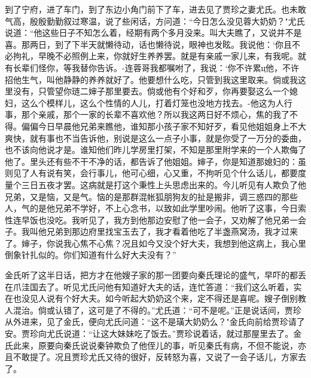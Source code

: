 到了宁府，进了车门，到了东边小角门前下了车，进去见了贾珍之妻尤氏。也未敢气高，殷殷勤勤叙过寒温，说了些闲话，方问道：“今日怎么没见蓉大奶奶？"尤氏说道：“他这些日子不知怎么着，经期有两个多月没来。叫大夫瞧了，又说并不是喜。那两日，到了下半天就懒待动，话也懒待说，眼神也发眩。我说他：`你且不必拘礼，早晚不必照例上来，你就好生养养罢。就是有亲戚一家儿来，有我呢。就有长辈们怪你，等我替你告诉。-连蓉哥我都嘱咐了，我说：`你不许累ц他，不许招他生气，叫他静静的养养就好了。他要想什么吃，只管到我这里取来。倘或我这里没有，只管望你琏二婶子那里要去。倘或他有个好和歹，你再要娶这么一个媳妇，这么个模样儿，这么个性情的人儿，打着灯笼也没地方找去。-他这为人行事，那个亲戚，那个一家的长辈不喜欢他？所以我这两日好不烦心，焦的我了不得。偏偏今日早晨他兄弟来瞧他，谁知那小孩子家不知好歹，看见他姐姐身上不大爽快，就有事也不当告诉他，别说是这么一点子小事，就是你受了一万分的委曲，也不该向他说才是。谁知他们昨儿学房里打架，不知是那里附学来的一个人欺侮了他了。里头还有些不干不净的话，都告诉了他姐姐。婶子，你是知道那媳妇的：虽则见了人有说有笑，会行事儿，他可心细，心又重，不拘听见个什么话儿，都要度量个三日五夜才罢。这病就是打这个秉性上头思虑出来的。今儿听见有人欺负了他兄弟，又是恼，又是气。恼的是那群混帐狐朋狗友的扯是搬非，调三惑四的那些人，气的是他兄弟不学好，不上心念书，以致如此学里吵闹。他听了这事，今日索性连早饭也没吃。我听见了，我方到他那边安慰了他一会子，又劝解了他兄弟一会子。我叫他兄弟到那边府里找宝玉去了，我才看着他吃了半盏燕窝汤，我才过来了。婶子，你说我心焦不心焦？况且如今又没个好大夫，我想到他这病上，我心里倒象针扎似的。你们知道有什么好大夫没有？”

金氏听了这半日话，把方才在他嫂子家的那一团要向秦氏理论的盛气，早吓的都丢在爪洼国去了。听见尤氏问他有知道好大夫的话，连忙答道：“我们这么听着，实在也没见人说有个好大夫。如今听起大奶奶这个来，定不得还是喜呢。嫂子倒别教人混治。倘或认错了，这可是了不得的。”尤氏道：“可不是呢。”正是说话间，贾珍从外进来，见了金氏，便向尤氏问道：“这不是璜大奶奶么？"金氏向前给贾珍请了安。贾珍向尤氏说道：“让这大妹妹吃了饭去。”贾珍说着话，就过那屋里去了。金氏此来，原要向秦氏说说秦钟欺负了他侄儿的事，听见秦氏有病，不但不能说，亦且不敢提了。况且贾珍尤氏又待的很好，反转怒为喜，又说了一会子话儿，方家去了。


